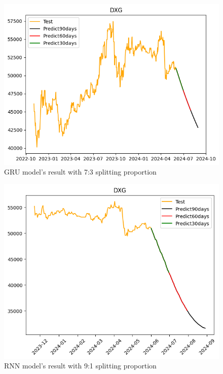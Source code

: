 \documentclass{ieeeojies}
\begin{document}
\begin{figure}[H]
  \centering
  \begin{minipage}{0.8\linewidth}
    \centering
        \includegraphics[width=\linewidth]{bibliography/Figure/GRU_7-3.png}
    \caption{GRU model’s result with 7:3 splitting proportion}
    \label{fig28}
  \end{minipage}
\end{figure}

\begin{figure}[H]
  \centering
  \begin{minipage}{0.8\linewidth}
    \centering
        \includegraphics[width=\linewidth]{bibliography/Figure/RNN_9-1.png}
    \caption{RNN model’s result with 9:1 splitting proportion}
    \label{fig28}
  \end{minipage}
\end{figure}
\end{document}

